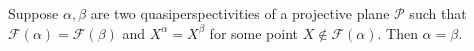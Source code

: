 Suppose $\alpha, \beta$ are two quasiperspectivities of a projective plane $\mathcal{P}$ such that $\mathcal{F}(\alpha) = \mathcal{F}(\beta)$ and $X^\alpha = X^\beta$ for some point $X \notin \mathcal{F}(\alpha)$. Then $\alpha = \beta$.
